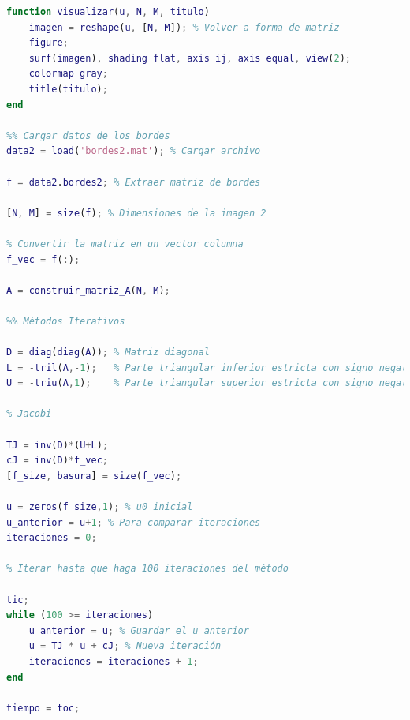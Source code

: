 \begin{homeworkProblem}
\begin{solucion}
\begin{enumerate}
\begin{lstlisting}[language = matlab]
%% Visualizar la solución
function visualizar(u, N, M, titulo)
    imagen = reshape(u, [N, M]); % Volver a forma de matriz
    figure;
    surf(imagen), shading flat, axis ij, axis equal, view(2);
    colormap gray;
    title(titulo);
end

%% Cargar datos de los bordes
data2 = load('bordes2.mat'); % Cargar archivo

f = data2.bordes2; % Extraer matriz de bordes

[N, M] = size(f); % Dimensiones de la imagen 2

% Convertir la matriz en un vector columna
f_vec = f(:);

A = construir_matriz_A(N, M);

%% Métodos Iterativos

D = diag(diag(A)); % Matriz diagonal
L = -tril(A,-1);   % Parte triangular inferior estricta con signo negativo
U = -triu(A,1);    % Parte triangular superior estricta con signo negativo

% Jacobi

TJ = inv(D)*(U+L);
cJ = inv(D)*f_vec;
[f_size, basura] = size(f_vec);

u = zeros(f_size,1); % u0 inicial
u_anterior = u+1; % Para comparar iteraciones
iteraciones = 0;

% Iterar hasta que haga 100 iteraciones del método

tic;
while (100 >= iteraciones)
    u_anterior = u; % Guardar el u anterior
    u = TJ * u + cJ; % Nueva iteración
    iteraciones = iteraciones + 1;
end

tiempo = toc;


\end{lstlisting}
\end{enumerate}
\end{solucion}
\end{homeworkProblem}

